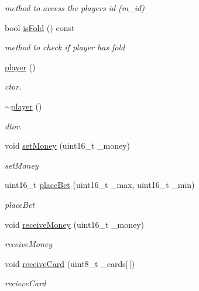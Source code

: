 \begin{DoxyCompactItemize}
\begin{DoxyCompactList}\small\item\em method to access the players id (m\-\_\-id) \end{DoxyCompactList}\item 
bool \hyperlink{classplayer_aec2aa85b8acf8ba8f6dba3f7db0cc6d9}{is\-Fold} () const 
\begin{DoxyCompactList}\small\item\em method to check if player has fold \end{DoxyCompactList}\item 
\hyperlink{classplayer_a97de83bce15f880241f561b55b016b02}{player} ()
\begin{DoxyCompactList}\small\item\em ctor. \end{DoxyCompactList}\item 
\hyperlink{classplayer_aab5d2e47b80e0481f09ca0df8b823057}{$\sim$player} ()
\begin{DoxyCompactList}\small\item\em dtor. \end{DoxyCompactList}\item 
void \hyperlink{classplayer_ae2f660aa48cbf4efe527918c86da49b8}{set\-Money} (uint16\-\_\-t \-\_\-money)
\begin{DoxyCompactList}\small\item\em set\-Money \end{DoxyCompactList}\item 
uint16\-\_\-t \hyperlink{classplayer_a9947ae2b627a57266c454c750b8586c1}{place\-Bet} (uint16\-\_\-t \-\_\-max, uint16\-\_\-t \-\_\-min)
\begin{DoxyCompactList}\small\item\em place\-Bet \end{DoxyCompactList}\item 
void \hyperlink{classplayer_a60210e6c1d1d8f73b9717e85674b0d27}{receive\-Money} (uint16\-\_\-t \-\_\-money)
\begin{DoxyCompactList}\small\item\em receive\-Money \end{DoxyCompactList}\item 
void \hyperlink{classplayer_a1124798ec756d79667f54e390ee585f7}{receive\-Card} (uint8\-\_\-t \-\_\-cards\mbox{[}$\,$\mbox{]})
\begin{DoxyCompactList}\small\item\em recieve\-Card \end{DoxyCompactList}\item 

\end{DoxyCompactItemize}
